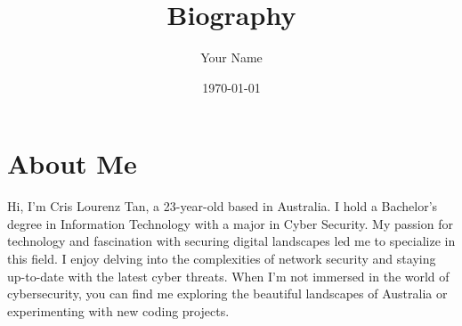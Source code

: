 \documentclass{article}
\begin{document}
\title{Biography}
\author{Your Name}
\date{\today}
\maketitle

\section*{About Me}
Hi, I'm Cris Lourenz Tan, a 23-year-old based in Australia. I hold a Bachelor's degree in Information Technology with a major in Cyber Security. My passion for technology and fascination with securing digital landscapes led me to specialize in this field. I enjoy delving into the complexities of network security and staying up-to-date with the latest cyber threats. When I'm not immersed in the world of cybersecurity, you can find me exploring the beautiful landscapes of Australia or experimenting with new coding projects.
\end{document}
